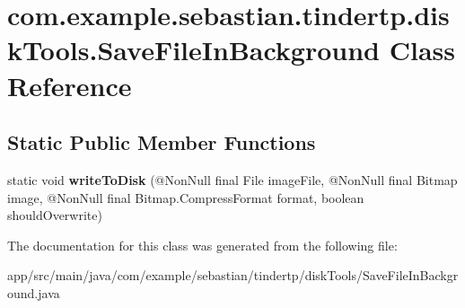 \hypertarget{classcom_1_1example_1_1sebastian_1_1tindertp_1_1diskTools_1_1SaveFileInBackground}{}\section{com.\+example.\+sebastian.\+tindertp.\+disk\+Tools.\+Save\+File\+In\+Background Class Reference}
\label{classcom_1_1example_1_1sebastian_1_1tindertp_1_1diskTools_1_1SaveFileInBackground}
\subsection*{Static Public Member Functions}
\begin{DoxyCompactItemize}
\item 
static void {\bfseries write\+To\+Disk} (@Non\+Null final File image\+File, @Non\+Null final Bitmap image, @Non\+Null final Bitmap.\+Compress\+Format format, boolean should\+Overwrite)\hypertarget{classcom_1_1example_1_1sebastian_1_1tindertp_1_1diskTools_1_1SaveFileInBackground_a05d276300b87e1962ca400613b496ab2}{}\label{classcom_1_1example_1_1sebastian_1_1tindertp_1_1diskTools_1_1SaveFileInBackground_a05d276300b87e1962ca400613b496ab2}

\end{DoxyCompactItemize}


The documentation for this class was generated from the following file\+:\begin{DoxyCompactItemize}
\item 
app/src/main/java/com/example/sebastian/tindertp/disk\+Tools/Save\+File\+In\+Background.\+java\end{DoxyCompactItemize}
